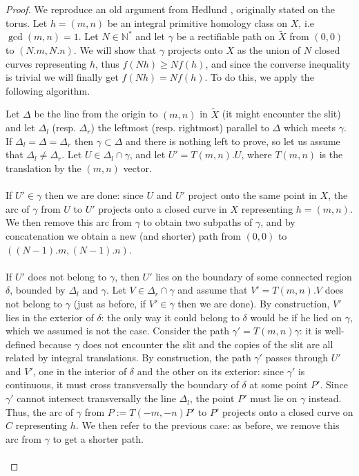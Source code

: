 \documentclass{article}
\newcommand{\NN}{\mathbb{N}}
\theoremstyle{definition}
\begin{document}
\begin{proof}
	We reproduce an old argument from Hedlund \cite{Hed}, originally stated on the torus. Let $h=(m,n)$ be an integral primitive homology class on $X$, i.e $\gcd(m,n)=1$. Let $N\in \NN^*$ and let $\gamma$ be a rectifiable path on $\tilde{X}$ from $(0,0)$ to $(N.m,N.n)$. We will show that $\gamma$ projects onto $X$ as the union of $N$ closed curves representing $h$, thus $f(Nh) \ge Nf(h)$, and since the converse inequality is trivial we will finally get $f(Nh) = Nf(h)$. To do this, we apply the following algorithm.\newline 
	
	
	Let $\Delta$ be the line from the origin to $(m,n)$ in $\tilde{X}$ (it might encounter the slit) and let $\Delta_l$ (resp. $\Delta_r$) the leftmost (resp. rightmost) parallel to $\Delta$ which meets $\gamma$. If $\Delta_l = \Delta = \Delta_r$ then $\gamma \subset \Delta$ and there is nothing left to prove, so let us assume that $\Delta_l \ne \Delta_r$. Let $U \in \Delta_l \cap \gamma$, and let $U' = T(m,n).U$, where $T(m,n)$ is the translation by the $(m,n)$ vector. \\ \\
	
	
	If $U' \in \gamma$ then we are done: since $U$ and $U'$ project onto the same point in $X$, the arc of $\gamma$ from $U$ to $U'$ projects onto a closed curve in $X$ representing $h=(m,n)$. We then remove this arc from $\gamma$ to obtain two subpaths of $\gamma$, and by concatenation we obtain a new (and shorter) path from $(0,0)$ to $((N-1).m, (N-1).n)$. \\ \\
	
	If $U'$ does not belong to $\gamma$, then $U'$ lies on the boundary of some connected region $\delta$, bounded by $\Delta_l$ and $\gamma$. Let $V \in \Delta_r \cap \gamma$ and assume that $V'=T(m,n).V$ does not belong to $\gamma$ (just as before, if $V' \in \gamma$ then we are done). By construction, $V'$ lies in the exterior of $\delta$: the only way it could belong to $\delta$ would be if he lied on $\gamma$, which we assumed is not the case. Consider the path $\gamma' = T(m,n) \gamma$: it is well-defined because $\gamma$ does not encounter the slit and the copies of the slit are all related by integral translations. By construction, the path $\gamma'$ passes through $U'$ and $V'$, one in the interior of $\delta$ and the other on its exterior: since $\gamma'$ is continuous, it must cross transversally the boundary of $\delta$ at some point $P'$. Since $\gamma'$ cannot intersect transversally the line $\Delta_l$, the point $P'$ must lie on $\gamma$ instead. Thus, the arc of $\gamma$ from $P := T(-m,-n) P' $ to $P'$ projects onto a closed curve on $C$ representing $h$. We then refer to the previous case: as before, we remove this arc from $\gamma$ to get a shorter path. \\ \\
	

\end{proof}
\end{document}
